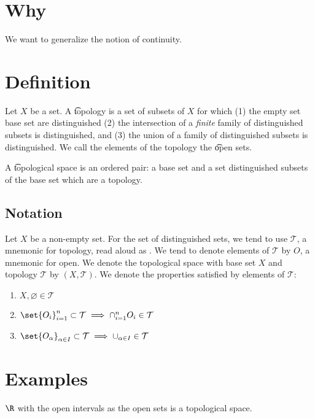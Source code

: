 

\section*{Why}

We want to generalize the notion of continuity.

\section*{Definition}

Let $X$ be a set.
A \t{topology} is a set of subsets of $X$ for which (1) the empty set base set are distinguished (2) the intersection of a \textit{finite} family of distinguished subsets is distinguished, and (3) the union of a family of distinguished subsets is distinguished.
We call the elements of the topology the \t{open sets}.

A \t{topological space} is an ordered pair: a base set and a set distinguished subsets of the base set which are a topology.

\subsection*{Notation}

Let $X$ be a non-empty set.
For the set of distinguished sets, we tend to use $\mathcal{T} $, a mnemonic for topology, read aloud as .
We tend to denote elements of $\mathcal{T} $ by $O$, a mnemonic for open.
We denote the topological space with base set $X$ and topology $\mathcal{T} $ by $(X, \mathcal{T} )$.
We denote the properties satisfied by elements of $\mathcal{T} $:
    \begin{enumerate}
      \item $X, \varnothing \in \mathcal{T} $
      \item $\set{O_i}_{i = 1}^{n} \subset \mathcal{T}  \implies \cap _{i = 1}^{n} O_i \in \mathcal{T} $
      \item $\set{O_\alpha }_{\alpha  \in I} \subset \mathcal{T} \implies \cup_{\alpha  \in I} \in \mathcal{T} $
    \end{enumerate}

\section*{Examples}

$\R $ with the open intervals as the open sets is a topological space.
